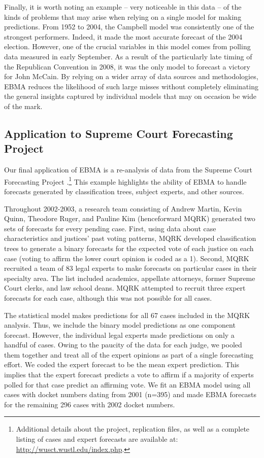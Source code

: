 \documentclass[pdftex,12pt,fullpage,oneside]{amsart}
\begin{document}
 Finally, it is worth noting an example -- very noticeable in this
 data -- of the kinds of problems that may arise when relying on a
 single model for making predictions.  From 1952 to 2004, the Campbell
 model was consistently one of the strongest performers.  Indeed, it
 made the most accurate forecast of the 2004 election.  However, one
 of the crucial variables in this model comes from polling data
 measured in early September.  As a result of the particularly late
 timing of the Republican Convention in 2008, it was the only model to
 forecast a victory for John McCain.  By relying on a wider array of
 data sources and methodologies, EBMA reduces the likelihood of such
 large misses without completely eliminating the general insights
 captured by individual models that may on occasion be wide of the
 mark.


\subsection{Application to Supreme Court Forecasting Project}

Our final application of EBMA is a re-analysis of data from the
Supreme Court Forecasting Project \citep{Ruger:2004,
  Martin:2004}.\footnote{Additional details about the project,
  replication files, as well as a complete listing of cases and expert
  forecasts are available at: \url{http://wusct.wustl.edu/index.php}.}
This example highlights the ability of EBMA to handle forecasts
generated by classification trees, subject experts, and other sources.

Throughout 2002-2003, a research team consisting of Andrew
Martin, Kevin Quinn, Theodore Ruger, and Pauline Kim (henceforward
MQRK) generated two sets of forecasts for every pending case.  First,
using data about case characteristics and justices' past voting
patterns, MQRK developed classification trees to generate a binary
forecasts for the expected vote of each justice on each case (voting
to affirm the lower court opinion is coded as a 1).  Second, MQRK
recruited a team of 83 legal experts to make forecasts on particular
cases in their specialty area.  The list included academics, appellate
attorneys, former Supreme Court clerks, and law school deans.  MQRK
attempted to recruit three expert forecasts for each case, although
this was not possible for all cases.

The statistical model makes predictions for all 67 cases included in
the MQRK analysis.  Thus, we include the binary model predictions as
one component forecast. However, the individual legal experts made
predictions on only a handful of cases. Owing to the paucity of the
data for each judge, we pooled them together and treat all of the
expert opinions as part of a single forecasting effort.  We coded the
expert forecast to be the mean expert prediction. This implies that
the expert forecast predicts a vote to affirm if a majority of experts
polled for that case predict an affirming vote.  We fit an EBMA model
using all cases with docket numbers dating from 2001 (n=395) and made
EBMA forecasts for the remaining 296 cases with 2002 docket numbers.
\end{document}
